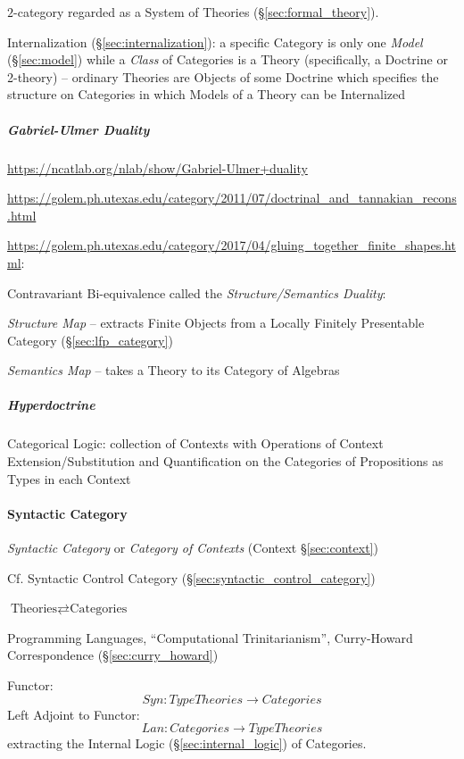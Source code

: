 $2$-category regarded as a System of Theories
(\S\ref{sec:formal_theory}).

Internalization (\S\ref{sec:internalization}): a specific Category is
only one \emph{Model} (\S\ref{sec:model}) while a \emph{Class} of
Categories is a Theory (specifically, a Doctrine or 2-theory) --
ordinary Theories are Objects of some Doctrine which specifies the
structure on Categories in which Models of a Theory can be Internalized



\subparagraph{Gabriel-Ulmer Duality}\label{sec:gabriel_ulmer_duality}
\hfill

\url{https://ncatlab.org/nlab/show/Gabriel-Ulmer+duality}

\url{https://golem.ph.utexas.edu/category/2011/07/doctrinal_and_tannakian_recons.html}

\url{https://golem.ph.utexas.edu/category/2017/04/gluing_together_finite_shapes.html}:

Contravariant Bi-equivalence called the \emph{Structure/Semantics
  Duality}:

\emph{Structure Map} -- extracts Finite Objects from a Locally
Finitely Presentable Category (\S\ref{sec:lfp_category})

\emph{Semantics Map} -- takes a Theory to its Category of Algebras



\subparagraph{Hyperdoctrine}\label{sec:hyperdoctrine}\hfill

Categorical Logic: collection of Contexts with Operations of Context
Extension/Substitution and Quantification on the Categories of
Propositions as Types in each Context



\paragraph{Syntactic Category}\label{sec:syntactic_category}\hfill

\emph{Syntactic Category} or \emph{Category of Contexts} (Context
\S\ref{sec:context})

\fist Cf. Syntactic Control Category
(\S\ref{sec:syntactic_control_category})

$\text{Theories} \rightleftarrows \text{Categories}$

Programming Languages, ``Computational Trinitarianism'', Curry-Howard
Correspondence (\S\ref{sec:curry_howard})

Functor:
\[
  Syn : TypeTheories \rightarrow Categories
\]
Left Adjoint to Functor:
\[
  Lan : Categories \rightarrow TypeTheories
\]
extracting the Internal Logic (\S\ref{sec:internal_logic}) of
Categories.

